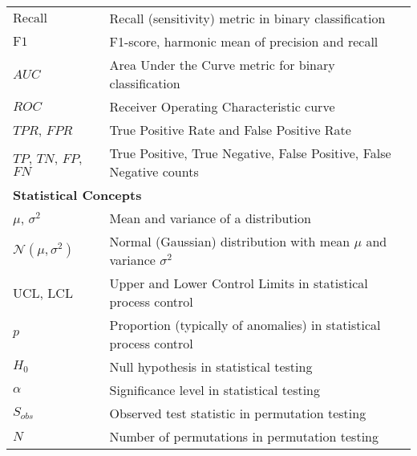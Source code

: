 \begin{appendices}
\begin{table}[htbp]
{\begin{tabular}{p{}p{}}
        $\text{Recall}$                             & Recall (sensitivity) metric in binary classification                                 \\
        $\text{F1}$                                 & F1-score, harmonic mean of precision and recall                                      \\
        $AUC$                                       & Area Under the Curve metric for binary classification                                \\
        $ROC$                                       & Receiver Operating Characteristic curve                                              \\
        $TPR$, $FPR$                                & True Positive Rate and False Positive Rate                                           \\
        $TP$, $TN$, $FP$, $FN$                      & True Positive, True Negative, False Positive, False Negative counts                  \\
        \midrule
        \multicolumn{2}{l}{\textbf{Statistical Concepts}}                                                                                  \\
        \midrule
        $\mu$, $\sigma^2$                           & Mean and variance of a distribution                                                  \\
        $\mathcal{N}(\mu,\sigma^2)$                 & Normal (Gaussian) distribution with mean $\mu$ and variance $\sigma^2$               \\
        $\text{UCL}$, $\text{LCL}$                  & Upper and Lower Control Limits in statistical process control                        \\
        $p$                                         & Proportion (typically of anomalies) in statistical process control                   \\
        $H_0$                                       & Null hypothesis in statistical testing                                               \\
        $\alpha$                                    & Significance level in statistical testing                                            \\
        $S_{obs}$                                   & Observed test statistic in permutation testing                                       \\
        $N$                                         & Number of permutations in permutation testing                                        \\

\end{tabular}}
\end{table}
\end{appendices}
